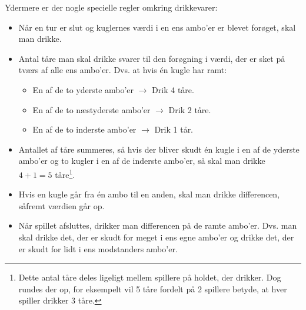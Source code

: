 Ydermere er der nogle specielle regler omkring drikkevarer:
\begin{itemize}
    \item Når en tur er slut og kuglernes værdi i en ens ambo'er er blevet forøget, skal man drikke.
    \item Antal tåre man skal drikke svarer til den forøgning i værdi, der er sket på tværs af alle ens ambo'er. Dvs. at hvis én kugle har ramt:
    \begin{itemize}
        \item En af de to yderste ambo'er $\rightarrow$ Drik 4 tåre.
        \item En af de to næstyderste ambo'er $\rightarrow$ Drik 2 tåre.
        \item En af de to inderste ambo'er $\rightarrow$ Drik 1 tår.
    \end{itemize}
    \item Antallet af tåre summeres, så hvis der bliver skudt én kugle i en af de yderste ambo'er og to kugler i en af de inderste ambo'er, så skal man drikke $4 + 1 = 5$ tåre\footnote{Dette antal tåre deles ligeligt mellem spillere på holdet, der drikker. Dog rundes der op, for eksempelt vil 5 tåre fordelt på 2 spillere betyde, at hver spiller drikker 3 tåre.}.
    \item Hvis en kugle går fra én ambo til en anden, skal man drikke differencen, såfremt værdien går op.
    \item Når spillet afsluttes, drikker man differencen på de ramte ambo'er. Dvs. man skal drikke det, der er skudt for meget i ens egne ambo'er og drikke det, der er skudt for lidt i ens modstanders ambo'er.
\end{itemize}